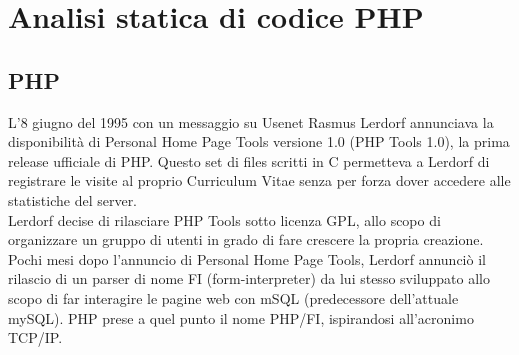 \chapter{Analisi statica di codice PHP}

\begin{epigraphs}
\end{epigraphs}

\section{PHP}
L’8 giugno del 1995 con un messaggio su Usenet Rasmus Lerdorf annunciava la disponibilità di Personal Home Page Tools versione 1.0 (PHP Tools 1.0), la prima release ufficiale di PHP\cite{php}. Questo set di files scritti in C permetteva a Lerdorf di registrare le visite al proprio Curriculum Vitae senza per forza dover accedere alle statistiche del server.\\
Lerdorf decise di rilasciare PHP Tools sotto licenza GPL, allo scopo di organizzare un gruppo di utenti in grado di fare crescere la propria creazione. Pochi mesi dopo l’annuncio di Personal Home Page Tools, Lerdorf annunciò il rilascio di un parser di nome FI (form-interpreter) da lui stesso sviluppato allo scopo di far interagire le pagine web con mSQL (predecessore dell’attuale mySQL). PHP prese a quel punto il nome PHP/FI, ispirandosi all'acronimo TCP/IP.


